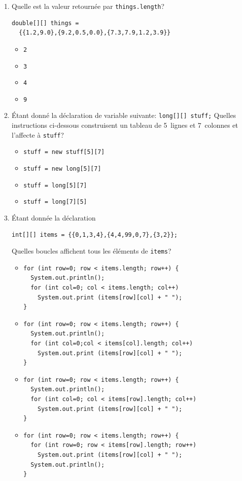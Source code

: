 \documentclass[11pt,a4paper]{article}
\newcommand{\boxitem}{\item[$\Box$]}
\begin{document}
\begin{enumerate}
  \item Quelle est la valeur retournée par \verb+things.length+?
  \begin{verbatim}
double[][] things =
  {{1.2,9.0},{9.2,0.5,0.0},{7.3,7.9,1.2,3.9}}
  \end{verbatim}
  \vspace*{-10pt}
  \begin{itemize}
    \boxitem \verb+2+
    \boxitem \verb+3+
    \boxitem \verb+4+
    \boxitem \verb+9+
  \end{itemize}

  \item Étant donné la déclaration de variable suivante:
  \verb+long[][] stuff;+
  Quelles instructions ci-dessous construisent un tableau de 5~lignes et
  7~colonnes et l'affecte à \verb+stuff+?
  \begin{itemize}
    \boxitem \verb+stuff = new stuff[5][7]+
    \boxitem \verb+stuff = new long[5][7]+
    \boxitem \verb+stuff = long[5][7]+
    \boxitem \verb+stuff = long[7][5]+
  \end{itemize}

  \item Étant donnée la déclaration
  \begin{verbatim}
int[][] items = {{0,1,3,4},{4,4,99,0,7},{3,2}};
  \end{verbatim}
  \vspace*{-10pt}
  Quelles boucles affichent tous les éléments de \verb+items+?
  \begin{itemize}
    \boxitem
      \begin{verbatim}
for (int row=0; row < items.length; row++) {
  System.out.println();
  for (int col=0; col < items.length; col++)
    System.out.print (items[row][col] + " ");
}
      \end{verbatim}
      \vspace*{-10pt}
    \boxitem
      \begin{verbatim}
for (int row=0; row < items.length; row++) {
  System.out.println();
  for (int col=0;col < items[col].length; col++)
    System.out.print (items[row][col] + " ");
}
      \end{verbatim}
      \vspace*{-10pt}
    \boxitem
      \begin{verbatim}
for (int row=0; row < items.length; row++) {
  System.out.println();
  for (int col=0; col < items[row].length; col++)
    System.out.print (items[row][col] + " ");
}
      \end{verbatim}
      \vspace*{-10pt}
    \boxitem
      \begin{verbatim}
for (int row=0; row < items.length; row++) {
  for (int row=0; row < items[row].length; row++)
    System.out.print (items[row][col] + " ");
  System.out.println();
}
      \end{verbatim}
  \end{itemize}


\end{enumerate}
\end{document}
